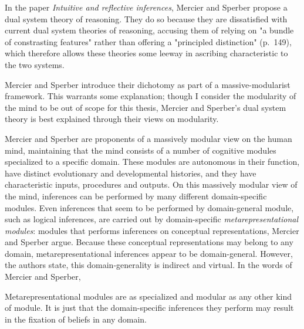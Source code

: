 In the \citeyear{MS09} paper \emph{Intuitive and reflective inferences}, Mercier and Sperber propose a dual system theory of reasoning. They do so because they are dissatisfied with current dual system theories of reasoning, accusing them of relying on "a bundle of constrasting features" rather than offering a "principled distinction" (p.~149), which therefore allows these theories some leeway in ascribing characteristic to the two systems.

Mercier and Sperber introduce their dichotomy as part of a massive-modularist framework. This warrants some explanation; though I consider the modularity of the mind to be out of scope for this thesis, Mercier and Sperber's dual system theory is best explained through their views on modularity.

Mercier and Sperber are proponents of a massively modular view on the human mind, maintaining that the mind consists of a number of cognitive modules specialized to a specific domain. These modules are autonomous in their function, have distinct evolutionary and developmental histories, and they have characteristic inputs, procedures and outputs.
On this massively modular view of the mind, inferences can be performed by many different domain-specific modules. Even inferences that seem to be performed by domain-general module, such as logical inferences, are carried out by domain-specific \emph{metarepresentational modules}: modules that performs inferences on conceptual representations, Mercier and Sperber argue.
Because these conceptual representations may belong to any domain, metarepresentational inferences appear to be domain-general. However, the authors state, this domain-generality is indirect and virtual. In the words of Mercier and Sperber,
\begin{quoting}
    Metarepresentational modules are as specialized and modular as any other kind of module. It is just that the domain-specific inferences they perform may result in the fixation of beliefs in any domain.
    \hfill \citep[p.~153]{MS09}
\end{quoting}

